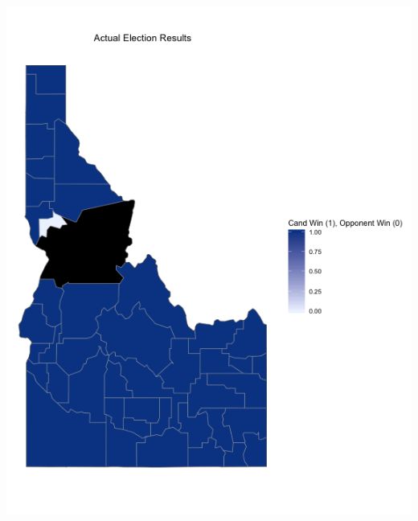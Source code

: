 \documentclass[11pt]{article}
\begin{document}
\includegraphics[scale=0.4]{../knn_plots/idaho_actual.png}\\
\end{document}
